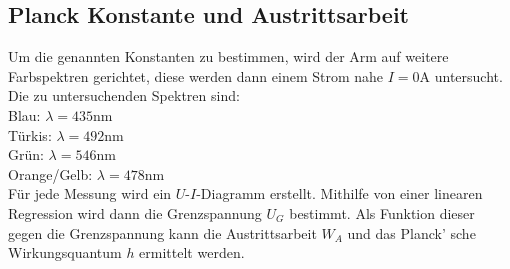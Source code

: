 \subsection{Planck Konstante und Austrittsarbeit}
\label{sec:aa}
Um die genannten Konstanten zu bestimmen, wird der Arm auf weitere Farbspektren 
gerichtet, diese werden dann einem Strom nahe $I = 0 \unit{\ampere}$ untersucht.
Die zu untersuchenden Spektren sind:
\vspace{0.5em}
\\
Blau: $\lambda = 435 \unit{\nano\meter}$
\vspace{0.5em}
\\
Türkis: $\lambda = 492 \unit{\nano\meter}$
\vspace{0.5em}
\\
Grün: $\lambda = 546 \unit{\nano\meter}$
\vspace{0.5em}
\\
Orange/Gelb: $\lambda = 478 \unit{\nano\meter}$
\vspace{0.5em}
\\
\noindent Für jede Messung wird ein $U$-$I$-Diagramm erstellt. Mithilfe von einer 
linearen Regression wird dann die Grenzspannung $U_G$ bestimmt. Als Funktion 
dieser gegen die Grenzspannung kann die Austrittsarbeit $W_A$ und das Planck'
sche Wirkungsquantum $h$ ermittelt werden.